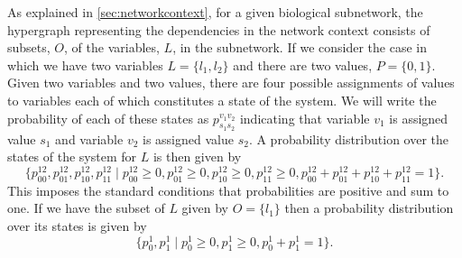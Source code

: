 As explained in \ref{sec:networkcontext}, for a given biological subnetwork, the hypergraph representing the dependencies in the network context consists of subsets, $O$, of the variables, $L$, in the subnetwork.
If we consider the case in which we have two variables $L=\{l_1,l_2\}$ and there are two values, $P=\{0,1\}$. Given two variables and two values, there are four possible assignments of values to variables each of which constitutes a state of the system. We will write the probability of each of these states as $p^{v_1v_2}_{s_1s_2}$ indicating that variable $v_1$ is assigned value $s_1$ and variable $v_2$ is assigned value $s_2$. A probability distribution over the states of the system for $L$ is then given by
\begin{equation}\label{eq:examplejointdist}
\{p^{12}_{00},p^{12}_{01},p^{12}_{10},p^{12}_{11} \mid p^{12}_{00} \geq 0, p^{12}_{01} \geq 0,p^{12}_{10} \geq 0,p^{12}_{11} \geq 0, p^{12}_{00} + p^{12}_{01} + p^{12}_{10} + p^{12}_{11} = 1 \}.
\end{equation}
This imposes the standard conditions that probabilities are positive and sum to one. If we have the subset of $L$ given by $O = \{l_1\}$ then a probability distribution over its states is given by
\begin{equation}\label{eq:examplemargdist}
\{p^{1}_{0}, p^{1}_{1} \mid p^{1}_{0} \geq 0, p^{1}_{1} \geq 0, p^{1}_{0}+p^{1}_{1} = 1 \}.
\end{equation}
